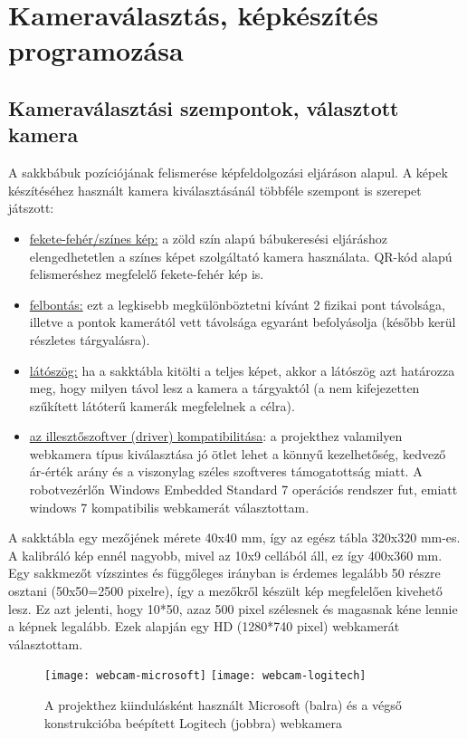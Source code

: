 \documentclass[../documentation.tex]{subfiles}
\begin{document}
\section{Kameraválasztás, képkészítés programozása}
\subsection{Kameraválasztási szempontok, választott kamera}
A sakkbábuk pozíciójának felismerése képfeldolgozási eljáráson alapul. A képek készítéséhez használt kamera kiválasztásánál többféle szempont is szerepet játszott:
\begin{itemize}
	\item \underline{fekete-fehér/színes kép:} a zöld szín alapú bábukeresési eljáráshoz elengedhetetlen a színes képet szolgáltató kamera használata. QR-kód alapú felismeréshez megfelelő fekete-fehér kép is.
	\item \underline{felbontás:} ezt a legkisebb megkülönböztetni kívánt 2 fizikai pont távolsága, illetve a pontok kamerától vett távolsága egyaránt befolyásolja (később kerül részletes tárgyalásra).
	\item \underline{látószög:} ha a sakktábla kitölti a teljes képet, akkor a látószög azt határozza meg, hogy milyen távol lesz a kamera a tárgyaktól (a nem kifejezetten szűkített látóterű kamerák megfelelnek a célra).
	\item \underline{az illesztőszoftver (driver) kompatibilitása}: a projekthez valamilyen webkamera típus kiválasztása jó ötlet lehet a könnyű kezelhetőség, kedvező ár-érték arány és a viszonylag széles szoftveres támogatottság miatt. A robotvezérlőn Windows Embedded Standard 7 operációs rendszer fut, emiatt windows 7 kompatibilis webkamerát választottam.
\end{itemize} 

A sakktábla egy mezőjének mérete 40x40 mm, így az egész tábla 320x320 mm-es. A kalibráló kép ennél nagyobb, mivel az 10x9 cellából áll, ez így 400x360 mm. Egy sakkmezőt vízszintes és függőleges irányban is érdemes legalább 50 részre osztani (50x50=2500 pixelre), így a mezőkről készült kép megfelelően kivehető lesz. Ez azt jelenti, hogy 10*50, azaz 500 pixel szélesnek és magasnak kéne lennie a képnek legalább. Ezek alapján egy HD (1280*740 pixel) webkamerát választottam. 

\begin{figure}[h]
	\centering
	\texttt{[image: webcam-microsoft]}
	\texttt{[image: webcam-logitech]}
	\caption{A projekthez kiindulásként használt Microsoft (balra) és a végső konstrukcióba beépített Logitech (jobbra) webkamera\protect\footnotemark}
	\label{fig:camera}
\end{figure}
\end{document}
